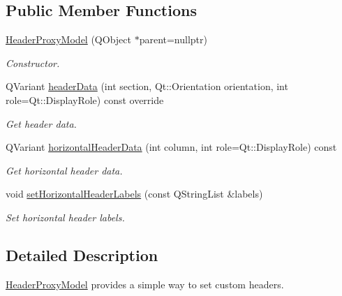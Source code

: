 \subsection*{Public Member Functions}
\begin{DoxyCompactItemize}
\item 
\hyperlink{class_mdt_1_1_item_model_1_1_header_proxy_model_af27843ac970fa2832121a406629b1978}{Header\+Proxy\+Model} (Q\+Object $\ast$parent=nullptr)\hypertarget{class_mdt_1_1_item_model_1_1_header_proxy_model_af27843ac970fa2832121a406629b1978}{}\label{class_mdt_1_1_item_model_1_1_header_proxy_model_af27843ac970fa2832121a406629b1978}

\begin{DoxyCompactList}\small\item\em Constructor. \end{DoxyCompactList}\item 
Q\+Variant \hyperlink{class_mdt_1_1_item_model_1_1_header_proxy_model_a235a2fb883c67db953319b5340dfeb23}{header\+Data} (int section, Qt\+::\+Orientation orientation, int role=Qt\+::\+Display\+Role) const override
\begin{DoxyCompactList}\small\item\em Get header data. \end{DoxyCompactList}\item 
Q\+Variant \hyperlink{class_mdt_1_1_item_model_1_1_header_proxy_model_a274a131720e80f358a426376886130e4}{horizontal\+Header\+Data} (int column, int role=Qt\+::\+Display\+Role) const 
\begin{DoxyCompactList}\small\item\em Get horizontal header data. \end{DoxyCompactList}\item 
void \hyperlink{class_mdt_1_1_item_model_1_1_header_proxy_model_a88a4b7d8a409e1c9f970482389942c1b}{set\+Horizontal\+Header\+Labels} (const Q\+String\+List \&labels)\hypertarget{class_mdt_1_1_item_model_1_1_header_proxy_model_a88a4b7d8a409e1c9f970482389942c1b}{}\label{class_mdt_1_1_item_model_1_1_header_proxy_model_a88a4b7d8a409e1c9f970482389942c1b}

\begin{DoxyCompactList}\small\item\em Set horizontal header labels. \end{DoxyCompactList}\end{DoxyCompactItemize}


\subsection{Detailed Description}
\hyperlink{class_mdt_1_1_item_model_1_1_header_proxy_model}{Header\+Proxy\+Model} provides a simple way to set custom headers. 

